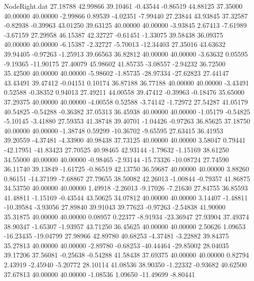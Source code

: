 \begin{filecontents}{NodeRight.dat}
  27.18788   42.99866   39.10461    -0.43544   -0.86519   44.88125   37.35000   40.00000   40.00000   -2.99866    0.89539   -4.02351   -7.99440
  27.23844   43.93845   37.32587    -0.82938   -0.39963   43.01250   39.63125   40.00000   40.00000   -3.93845    2.67413   -7.61989   -3.67159
  27.29958   46.15387   42.32727    -0.61451   -1.33075   39.58438   36.09375   40.00000   40.00000   -6.15387   -2.32727   -5.70013  -12.34403
  27.35016   43.63632   39.94405    -0.97263   -1.25913   39.66563   36.82812   40.00000   40.00000   -3.63632    0.05595   -9.19365  -11.90175
  27.40079   45.98602   41.85735    -3.08557   -2.94232   36.72500   35.42500   40.00000   40.00000   -5.98602   -1.85735  -28.97334  -27.62823
  27.44147   43.43491   39.47412    -0.04151    0.10174   36.87188   36.77188   40.00000   40.00000   -3.43491    0.52588   -0.38352    0.94013
  27.49211   44.00558   39.47412    -0.39963   -0.18476   35.65000   37.29375   40.00000   40.00000   -4.00558    0.52588   -3.74142   -1.72972
  27.54287   41.05179   40.54825    -0.54288   -0.36382   37.05313   36.45938   40.00000   40.00000   -1.05179   -0.54825   -5.10145   -3.41880
  27.59353   41.38748   39.40701    -1.04426   -0.97263   36.85625   37.18750   40.00000   40.00000   -1.38748    0.59299  -10.36702   -9.65595
  27.63415   36.41953   39.20559    -4.37481   -4.33900   40.98438   37.73125   40.00000   40.00000    3.58047    0.79441  -42.17951  -41.83423
  27.70525   40.98465   42.93144    -1.79632   -1.15169   38.61250   34.55000   40.00000   40.00000   -0.98465   -2.93144  -15.73326  -10.08724
  27.74590   36.11740   39.13849    -1.61725   -0.86519   42.13750   36.59687   40.00000   40.00000    3.88260    0.86151  -14.37199   -7.68867
  27.79655   38.50082   42.26013    -1.00844   -0.79357   41.86875   34.53750   40.00000   40.00000    1.49918   -2.26013   -9.17026   -7.21630
  27.84755   36.85593   41.48811    -1.15169   -0.43544   43.50625   34.07812   40.00000   40.00000    3.14407   -1.48811  -10.39584   -3.93056
  27.89840   39.91043   39.77623    -0.97263   -2.54838   41.90000   35.31875   40.00000   40.00000    0.08957    0.22377   -8.91934  -23.36947
  27.93904   37.49374   38.90347    -1.65307   -1.93957   43.71250   36.45625   40.00000   40.00000    2.50626    1.09653  -16.23435  -19.04799
  27.98966   42.89780   40.68253    -4.37481   -3.22882   39.84375   35.27813   40.00000   40.00000   -2.89780   -0.68253  -40.44464  -29.85002
  28.04035   39.17206   37.56081    -0.25638   -0.54288   41.58438   37.69375   40.00000   40.00000    0.82794    2.43919   -2.45940   -5.20772
  28.10114   41.08536   38.90350    -1.22332   -0.93682   40.62500   37.67813   40.00000   40.00000   -1.08536    1.09650  -11.49699   -8.80441

\end{filecontents}
